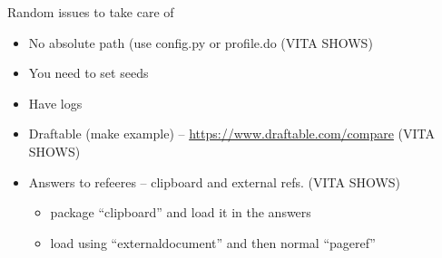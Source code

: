 \documentclass{beamer}
\begin{document}
\begin{frame}{Random issues to take care of}

\begin{itemize}
\item No absolute path (use config.py or profile.do (VITA SHOWS)
\item You need to set seeds
\item Have logs
\item Draftable (make example) -- \url{https://www.draftable.com/compare} (VITA SHOWS)
\item Answers to refeeres -- clipboard and external refs. (VITA SHOWS)
\begin{itemize}
	\item package ``clipboard'' and load it in the answers
	\item load using ``externaldocument'' and then normal ``pageref''
\end{itemize}
\end{itemize}



\end{frame}
\end{document}
